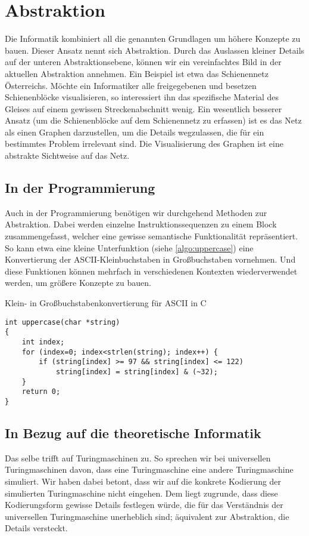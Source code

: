 \chapter{Abstraktion}
%
Die Informatik kombiniert all die genannten Grundlagen um höhere Konzepte
zu bauen. Dieser Ansatz nennt sich Abstraktion. Durch das Auslassen kleiner
Details auf der unteren Abstraktionsebene, können wir ein vereinfachtes Bild
in der aktuellen Abstraktion annehmen.
Ein Beispiel ist etwa das Schienennetz Österreichs. Möchte ein Informatiker
alle freigegebenen und besetzen Schienenblöcke visualisieren, so interessiert
ihn das spezifische Material des Gleises auf einem gewissen Streckenabschnitt
wenig. Ein wesentlich besserer Ansatz (um die Schienenblöcke auf dem
Schienennetz zu erfassen) ist es das Netz als einen Graphen darzustellen,
um die Details wegzulassen, die für ein bestimmtes Problem irrelevant sind.
Die Visualisierung des Graphen ist eine abstrakte Sichtweise auf das Netz.

\section{In der Programmierung}
%
Auch in der Programmierung benötigen wir durchgehend Methoden zur Abstraktion.
Dabei werden einzelne Instruktionssequenzen zu einem Block zusammengefasst,
welcher eine gewisse semantische Funktionalität repräsentiert. So kann etwa
eine kleine Unterfunktion (siehe \ref{algo:uppercase}) eine Konvertierung
der ASCII-Kleinbuchstaben in Großbuchstaben vornehmen. Und diese Funktionen
können mehrfach in verschiedenen Kontexten wiederverwendet werden,
um größere Konzepte zu bauen.

\begin{algorithm}[b]
\caption{Klein- in Großbuchstabenkonvertierung für ASCII in C}
\label{algo:uppercase}
\begin{verbatim}
int uppercase(char *string)
{
    int index;
    for (index=0; index<strlen(string); index++) {
        if (string[index] >= 97 && string[index] <= 122)
            string[index] = string[index] & (~32);
    }
    return 0;
}
\end{verbatim}
\end{algorithm}

\section{In Bezug auf die theoretische Informatik}
%
Das selbe trifft auf Turingmaschinen zu. So sprechen wir bei universellen
Turingmaschinen davon, dass eine Turingmaschine eine andere Turingmaschine
simuliert. Wir haben dabei betont, dass wir auf die konkrete Kodierung der
simulierten Turingmaschine nicht eingehen. Dem liegt zugrunde, dass diese
Kodierungsform gewisse Details festlegen würde, die für das Verständnis
der universellen Turingmaschine unerheblich sind; äquivalent zur Abstraktion,
die Details versteckt.

